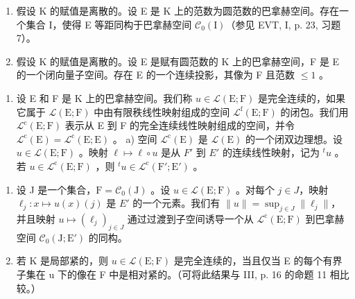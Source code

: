 \begin{enumerate}
\def\labelenumi{\alph{enumi})}
\setcounter{enumi}{4}
\item
  假设 K 的赋值是离散的。设 E 是 K 上的范数为圆范数的巴拿赫空间。存在一个集合 I，使得 E 等距同构于巴拿赫空间 \(\mathcal{C}_{0}(\mathrm{I})\)（参见 EVT, I, p. 23, 习题 7）。
\item
  假设 K 的赋值是离散的。设 E 是赋有圆范数的 K 上的巴拿赫空间，F 是 E 的一个闭向量子空间。存在 E 的一个连续投影，其像为 F 且范数 \(\leqslant 1\) 。
\end{enumerate}

\begin{enumerate}
\def\labelenumi{\arabic{enumi})}
\setcounter{enumi}{1}
\tightlist
\item
  设 E 和 F 是 K 上的巴拿赫空间。我们称 \(u \in \mathcal{L}(\mathrm{E};\mathrm{F})\) 是完全连续的，如果它属于 \(\mathcal{L}(\mathrm{E};\mathrm{F})\) 中由有限秩线性映射组成的空间 \(\mathcal{L}^{\mathrm{f}}(\mathrm{E};\mathrm{F})\) 的闭包。我们用 \(\mathcal{L}^{\mathrm{c}}(\mathrm{E};\mathrm{F})\) 表示从 E 到 F 的完全连续线性映射组成的空间，并令 \(\mathcal{L}^{\mathrm{c}}(\mathrm{E}) = \mathcal{L}^{\mathrm{c}}(\mathrm{E};\mathrm{E})\) 。 a) 空间 \(\mathcal{L}^{\mathrm{c}}(\mathrm{E})\) 是 \(\mathcal{L}(\mathrm{E})\) 的一个闭双边理想。设 \(u \in \mathcal{L}(\mathrm{E};\mathrm{F})\) 。映射 \(\ell \mapsto \ell \circ u\) 是从 \(F'\) 到 \(E'\) 的连续线性映射，记为 \({}^{t}u\) 。若 \(u \in \mathcal{L}^{\mathrm{c}}(\mathrm{E};\mathrm{F})\) ，则 \({}^{t}u \in \mathcal{L}^{\mathrm{c}}(\mathrm{F}'; \mathrm{E}')\) 。
\end{enumerate}

\begin{enumerate}
\def\labelenumi{\alph{enumi})}
\setcounter{enumi}{1}
\item
  设 J 是一个集合，\(\mathrm{F} = \mathcal{C}_{0}(\mathrm{J})\) 。设 \(u \in \mathcal{L}(\mathrm{E};\mathrm{F})\) 。对每个 \(j \in J\)，映射 \(\ell_{j} \colon x \mapsto u(x)(j)\) 是 \(E'\) 的一个元素。我们有 \(\|u\| = \sup_{j \in J} \| \ell_{j} \|\)，并且映射 \(u \mapsto (\ell_{j})_{j \in J}\) 通过过渡到子空间诱导一个从 \(\mathcal{L}^{\mathrm{c}}(\mathrm{E};\mathrm{F})\) 到巴拿赫空间 \(\mathcal{C}_{0}(\mathrm{J};\mathrm{E}')\) 的同构。
\item
  若 K 是局部紧的，则 \(u \in \mathcal{L}(\mathrm{E}; \mathrm{F})\) 是完全连续的，当且仅当 E 的每个有界子集在 u 下的像在 F 中是相对紧的。（可将此结果与 III, p. 16 的命题 11 相比较。）
\end{enumerate}


